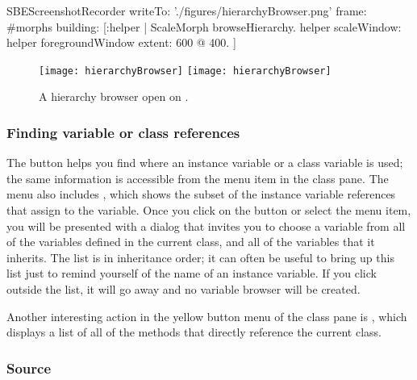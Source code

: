 \documentclass[a4paper,10pt,twoside]{book}
\begin{document}

\begin{ExecuteSmalltalkScript}
SBEScreenshotRecorder writeTo: './figures/hierarchyBrowser.png' frame: #morphs building: [:helper |
	ScaleMorph browseHierarchy.
	helper scaleWindow: helper foregroundWindow extent: 600 @ 400.
]
\end{ExecuteSmalltalkScript}
\begin{figure}[btp]
	\begin{center}
	\ifluluelse
		{\texttt{[image: hierarchyBrowser]}}
		{\texttt{[image: hierarchyBrowser]}}
	\end{center}
	\caption{A hierarchy browser open on .}
	\label{fig:hierarchyBrowser}
\end{figure}

\subsubsection{Finding variable or class references}
\label{sec:variables}

The  button helps you find where an instance variable or a class variable is used; the same information is accessible from the  menu item  in the class pane.
The menu also includes , which shows the subset of the instance variable references that assign to the variable.
Once you click on the button or select the menu item, you will be presented with a dialog that invites you to choose a variable from all of the variables defined in the current class, and all of the variables that it inherits.
The list is in inheritance order; it can often be useful to bring up this list just to remind yourself of the name of an instance variable.
If you click outside the list, it will go away and no variable browser will be created.

Another interesting action in the yellow button menu of the class pane is , which displays a list of all of the methods that directly reference the current class.

\subsubsection{Source}
\label{sec:sources}
\end{document}
